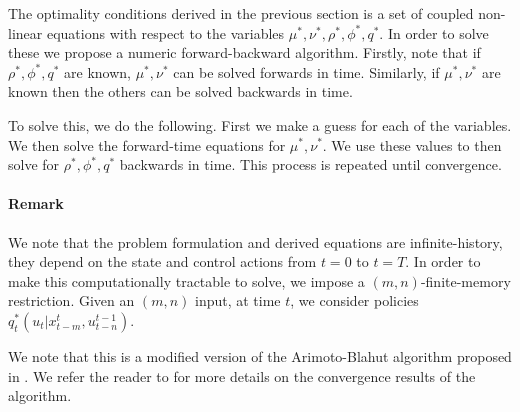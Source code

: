 The optimality conditions derived in the previous section is a set of coupled non-linear equations with respect to the variables $\mu^{*},\nu^*,\rho^*,\phi^*,q^*$. In order to solve these we propose a numeric forward-backward algorithm. Firstly, note that if $\rho^*,\phi^*,q^*$ are known, $\mu^{*},\nu^*$ can be solved forwards in time. Similarly, if $\mu^{*},\nu^*$ are known then the others can be solved backwards in time. 

To solve this, we do the following. First we make a guess for each of the variables. We then solve the forward-time equations for $\mu^{*},\nu^*$. We use these values to then solve for $\rho^*,\phi^*,q^*$ backwards in time. This process is repeated until convergence. 

\paragraph*{Remark} We note that the problem formulation and derived equations are infinite-history, \ie they depend on the state and control actions from $t=0$ to $t=T$. In order to make this computationally tractable to solve, we impose a $(m,n)$-finite-memory restriction. Given an $(m,n)$ input, at time $t$, we consider policies $q_t^*(u_t|x^t_{t-m},u^{t-1}_{t-n})$. 

We note that this is a modified version of the Arimoto-Blahut algorithm proposed in \cite{Naiss13}. We refer the reader to \cite{takashi17} for more details on the convergence results of the algorithm. 
